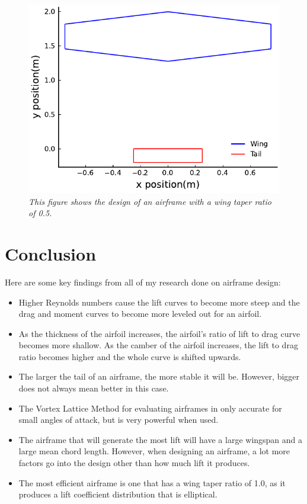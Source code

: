 \documentclass{journal}
\begin{document}
	\begin{figure}[H]
		\includegraphics{../graphics/taper_design.pdf}
		\caption{\emph{This figure shows the design of an airframe with a wing taper ratio of 0.5.}}
		\label{fig:taper_design}
	\end{figure}

	\section{Conclusion}
	Here are some key findings from all of my research done on airframe design:
	 \begin{itemize}
	 	\item Higher Reynolds numbers cause the lift curves to become more steep and the drag and moment curves to become more leveled out for an airfoil.
	 	\item As the thickness of the airfoil increases, the airfoil's ratio of lift to drag curve becomes more shallow. As the camber of the airfoil increases, the lift to drag ratio becomes higher and the whole curve is shifted upwards. 
	 	\item The larger the tail of an airframe, the more stable it will be. However, bigger does not always mean better in this case.
	 	\item The Vortex Lattice Method for evaluating airframes in only accurate for small angles of attack, but is very powerful when used.
	 	\item The airframe that will generate the most lift will have a large wingspan and a large mean chord length. However, when designing an airframe, a lot more factors go into the design other than how much lift it produces.
	 	\item The most efficient airframe is one that has a wing taper ratio of 1.0, as it produces a lift coefficient distribution that is elliptical.
	 \end{itemize}
\end{document}
